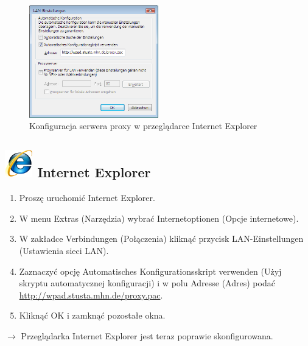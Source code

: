 \documentclass[a4paper,12pt]{scrartcl}
\begin{document}
\begin{figure}
  \begin{center}
    \includegraphics[width=0.5\textwidth,keepaspectratio]{Bilder/Proxy_IE}
  \end{center}
  \caption{Konfiguracja serwera proxy w przeglądarce Internet Explorer}
\end{figure}

\subsection*{\includegraphics[height=1.2cm,keepaspectratio]{Bilder/Internet_Explorer_7_Logo} Internet Explorer}
\begin{enumerate}
    \item Proszę uruchomić Internet Explorer.
    \item W menu Extras (Narzędzia) wybrać Internetoptionen (Opcje internetowe).
    \item W zakładce Verbindungen (Połączenia) kliknąć przycisk LAN-Einstellungen (Ustawienia sieci LAN).
    \item Zaznaczyć opcję  Automatisches Konfigurationsskript verwenden (Użyj skryptu automatycznej konfiguracji) i w polu Adresse (Adres) podać\\ \url{http://wpad.stusta.mhn.de/proxy.pac}.
    \item Kliknąć OK i zamknąć pozostałe okna.
\end{enumerate}
$\rightarrow$ Przeglądarka Internet Explorer jest teraz poprawie skonfigurowana.
\end{document}

